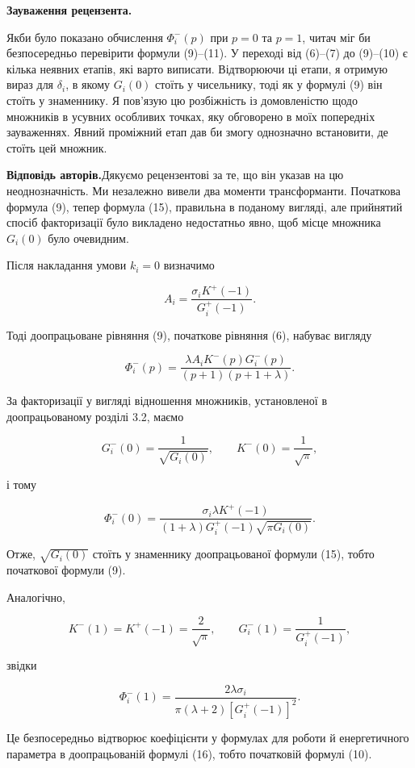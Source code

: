 \documentclass[11pt]{article}
\newcommand{\responseheading}{\textbf{Відповідь авторів.}\enspace}
\newenvironment{reviewcomment}{\def\FrameCommand{\textcolor{blue!45!black}{\vrule width 1.2pt}\hspace{9pt}}\MakeFramed{\advance\hsize-\width\FrameRestore}\noindent\textbf{Зауваження рецензента.}\par\smallskip\noindent}{\endMakeFramed}
\begin{document}
\begin{reviewcomment}
Якби було показано обчислення \(\Phi_i^-(p)\) при \(p=0\) та \(p=1\), читач міг би безпосередньо перевірити формули (9)–(11). У переході від (6)–(7) до (9)–(10) є кілька неявних етапів, які варто виписати. Відтворюючи ці етапи, я отримую вираз для \(\delta_i\), в якому \(G_i(0)\) стоїть у чисельнику, тоді як у формулі (9) він стоїть у знаменнику. Я пов’язую цю розбіжність із домовленістю щодо множників в усувних особливих точках, яку обговорено в моїх попередніх зауваженнях. Явний проміжний етап дав би змогу однозначно встановити, де стоїть цей множник.
\end{reviewcomment}

\responseheading Дякуємо рецензентові за те, що він указав на цю неоднозначність. Ми незалежно вивели два моменти трансформанти. Початкова формула (9), тепер формула (15), правильна в поданому вигляді, але прийнятий спосіб факторизації було викладено недостатньо явно, щоб місце множника \(G_i(0)\) було очевидним.

Після накладання умови \(k_i=0\) визначимо

\[
A_i=\frac{\sigma_iK^+(-1)}{G_i^+(-1)}.
\]

Тоді доопрацьоване рівняння (9), початкове рівняння (6), набуває вигляду

\[
\Phi_i^-(p)=
\frac{\lambda A_iK^-(p)G_i^-(p)}
{(p+1)(p+1+\lambda)}.
\]

За факторизації у вигляді відношення множників, установленої в доопрацьованому розділі 3.2, маємо

\[
G_i^-(0)=\frac{1}{\sqrt{G_i(0)}},
\qquad
K^-(0)=\frac{1}{\sqrt{\pi}},
\]

і тому

\[
\Phi_i^-(0)=
\frac{\sigma_i\lambda K^+(-1)}
{(1+\lambda)G_i^+(-1)\sqrt{\pi G_i(0)}}.
\]

Отже, \(\sqrt{G_i(0)}\) стоїть у знаменнику доопрацьованої формули (15), тобто початкової формули (9).

Аналогічно,

\[
K^-(1)=K^+(-1)=\frac{2}{\sqrt{\pi}},
\qquad
G_i^-(1)=\frac{1}{G_i^+(-1)},
\]

звідки

\[
\Phi_i^-(1)=
\frac{2\lambda\sigma_i}
{\pi(\lambda+2)[G_i^+(-1)]^2}.
\]

Це безпосередньо відтворює коефіцієнти у формулах для роботи й енергетичного параметра в доопрацьованій формулі (16), тобто початковій формулі (10).
\end{document}
